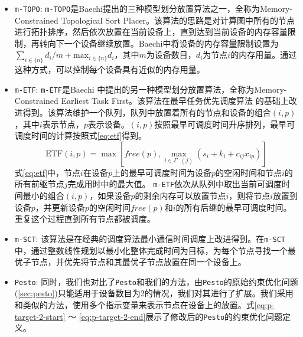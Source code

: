\begin{itemize}
	\item \texttt{m-TOPO}: \texttt{m-TOPO}是Baechi提出的三种模型划分放置算法之一，全称为Memory-Constrained Topological Sort Placer。该算法的思路是对计算图中所有的节点进行拓扑排序，然后依次放置在当前设备上，直到达到当前设备的内存容量限制，再转向下一个设备继续放置。Baechi中将设备的内存容量限制设置为$\sum_{i\in\{n\}}d_i / m + \mathrm{max}_{i\in\{n\}} d_i$，其中$m$为设备数目，$d_i$为节点$i$的内存用量。通过这种方式，可以控制每个设备具有近似的内存用量。
	\item \texttt{m-ETF}: \texttt{m-ETF}是Baechi 中提出的另一种模型划分放置算法，全称为Memory-Constrained Earliest Task First。该算法在最早任务优先调度算法 的基础上改进得到。该算法维护一个队列，队列中放置着所有的节点和设备的组合$(i,p)$，其中$i$表示节点，$p$表示设备。$(i,p)$按照最早可调度时间升序排列，最早可调度时间的计算按照式\ref{eq:etf}得到。
	\begin{equation}
		\label{eq:etf}
		\mathrm{ETF}(i,p) = \max\left[\mathit{free(p)}, \max_{i\in \Gamma^- (j)}(s_i+k_i+c_{ij}x_{ip}) \right]
	\end{equation}
	式\ref{eq:etf}中，节点$i$在设备$p$上的最早可调度时间为设备$p$的空闲时间和节点$i$的所有前驱节点$j$完成用时中的最大值。
	\texttt{m-ETF}依次从队列中取出当前可调度时间最小的组合$(i,p)$，如果设备$p$的剩余内存可以放置节点$i$，则将节点$i$放置到设备$p$，并更新设备$p$的空闲时间$\mathit{free}(p)$和$i$的所有后继的最早可调度时间。重复这个过程直到所有节点都被调度。

	\item \texttt{m-SCT}: 该算法是在经典的调度算法最小通信时间调度上改进得到。在\texttt{m-SCT}中，通过整数线性规划以最小化整体完成时间为目标，为每个节点寻找一个最优子节点，并优先将节点和其最优子节点放置在同一个设备上。
	\item \texttt{Pesto}: 同时，我们也对比了\texttt{Pesto}和我们的方法，由\texttt{Pesto}的原始约束优化问题(\ref{sec:pesto})只能适用于设备数目为2的情况，我们对其进行了扩展。我们采用和\sys{}类似的方法，使用多个指示变量来表示节点在设备上的放置。式\ref{eq:p-target-2-start} ～  \ref{eq:p-target-2-end}展示了修改后的\texttt{Pesto}的约束优化问题定义。
\end{itemize}

